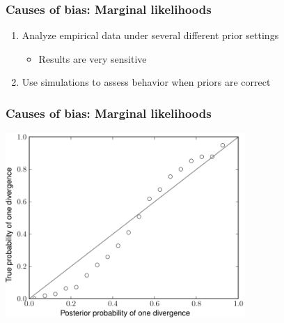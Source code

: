 \begin{frame}
    \frametitle{Causes of bias: Marginal likelihoods}
    \begin{enumerate}
        \item<3-> Analyze empirical data under several different prior settings
            \begin{itemize}
                \item<3-> Results are very sensitive
            \end{itemize}
        \item<4-> Use simulations to assess behavior when priors are correct
    \end{enumerate}
\end{frame}

\begin{frame}
    \frametitle{Causes of bias: Marginal likelihoods}
    \centerline{
    \includegraphics[height=7.0cm]{images/validation-model-choice-old.pdf}}
\end{frame}

